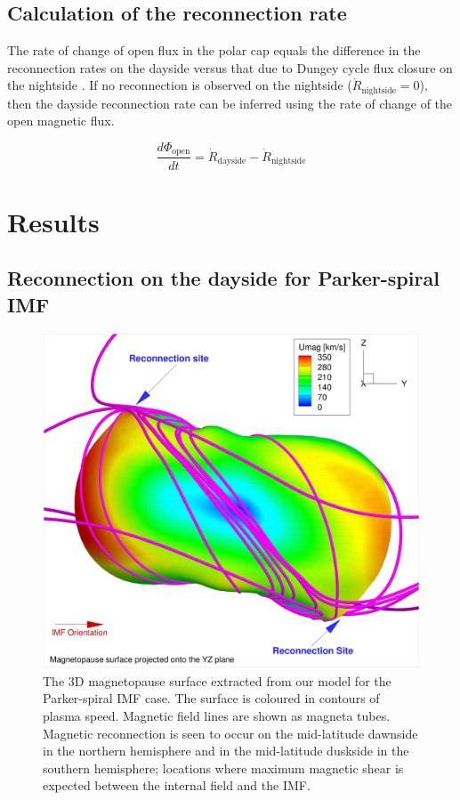 \subsection{Calculation of the reconnection rate}
The rate of change of open flux in the polar cap equals the difference in the reconnection rates on the dayside versus that due to Dungey cycle flux closure on the nightside \cite{Milan2007MagneticRates}. If no reconnection is observed on the nightside ($\dot{R}_\text{nightside}=0$), then the dayside reconnection rate can be inferred using the rate of change of the open magnetic flux. 

\begin{equation}
    \frac{d\Phi_\text{open}}{dt} = \dot{R}_\text{dayside} - \dot{R}_\text{nightside}
\end{equation}

\section{Results}

\subsection{Reconnection on the dayside for Parker-spiral IMF}
\begin{figure}
    \centering
    \includegraphics[width=\textwidth]{images4/reconnection-dayside.jpg}
    \caption{The 3D magnetopause surface extracted from our model for the Parker-spiral IMF case. The surface is coloured in contours of plasma speed. Magnetic field lines are shown as magneta tubes. Magnetic reconnection is seen to occur on the mid-latitude dawnside in the northern hemisphere and in the mid-latitude duskside in the southern hemisphere; locations where maximum magnetic shear is expected between the internal field and the IMF.}
    \label{fig:reconnection-dayside}
\end{figure}

